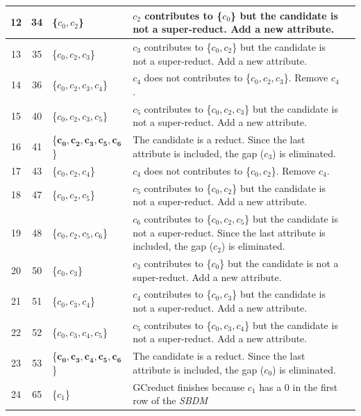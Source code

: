 \documentclass[number,preprint,review,12pt]{elsarticle}
\begin{document}
\begin{table}[!htb]
\begin{tabular}{|c|c|l|l|l|}
				\hline
		12 & 34 & \{$c_0,c_2$\}				& \multicolumn{1}{p{8.5cm}|}{$c_2$ contributes to \{$c_0$\} but the candidate is not a super-reduct. Add a new attribute.}\\
				\hline
		13 & 35 & \{$c_0,c_2,c_3$\}	    	& \multicolumn{1}{p{8.5cm}|}{$c_3$ contributes to \{$c_0,c_2$\} but the candidate is not a super-reduct. Add a new attribute.}\\
				\hline
		14 & 36 & \{$c_0,c_2,c_3,c_4$\}		& \multicolumn{1}{p{8.5cm}|}{$c_4$ does not contributes to \{$c_0,c_2,c_3$\}. Remove $c_4$.}\\
				\hline
		15 & 40 & \{$c_0,c_2,c_3,c_5$\}		& \multicolumn{1}{p{8.5cm}|}{$c_5$ contributes to \{$c_0,c_2,c_3$\} but the candidate is not a super-reduct. Add a new attribute.}\\
				\hline
		16 & 41 & \{$\mathbf{c_0,c_2,c_3,c_5,c_6}$\} & \multicolumn{1}{p{8.5cm}|}{The candidate is a reduct. Since the last attribute is included, the gap ($c_3$) is eliminated.}\\
				\hline
		17 & 43 & \{$c_0,c_2,c_4$\}			& \multicolumn{1}{p{8.5cm}|}{$c_4$ does not contributes to \{$c_0,c_2$\}. Remove $c_4$.}\\
				\hline
		18 & 47 & \{$c_0,c_2,c_5$\}			& \multicolumn{1}{p{8.5cm}|}{$c_5$ contributes to \{$c_0,c_2$\} but the candidate is not a super-reduct. Add a new attribute.}\\
				\hline
		19 & 48 & \{$c_0,c_2,c_5,c_6$\}		& \multicolumn{1}{p{8.5cm}|}{$c_6$ contributes to \{$c_0,c_2,c_5$\} but the candidate is not a super-reduct. Since the last attribute is included, the gap ($c_2$) is eliminated.}\\
				\hline
		20 & 50 & \{$c_0,c_3$\}				& \multicolumn{1}{p{8.5cm}|}{$c_3$ contributes to \{$c_0$\} but the candidate is not a super-reduct. Add a new attribute.}\\    
				\hline		
		21 & 51 & \{$c_0,c_3,c_4$\}			& \multicolumn{1}{p{8.5cm}|}{$c_4$ contributes to \{$c_0,c_3$\} but the candidate is not a super-reduct. Add a new attribute.}\\
				\hline
		22 & 52 & \{$c_0,c_3,c_4,c_5$\}		& \multicolumn{1}{p{8.5cm}|}{$c_5$ contributes to \{$c_0,c_3,c_4$\} but the candidate is not a super-reduct. Add a new attribute.}\\
				\hline
		23 & 53 & \{$\mathbf{c_0,c_3,c_4,c_5,c_6}$\} & \multicolumn{1}{p{8.5cm}|}{The candidate is a reduct. Since the last attribute is included, the gap ($c_0$) is eliminated.}\\
				\hline
		24 & 65 & \{$c_1$\} 				& \multicolumn{1}{p{8.5cm}|}{GCreduct finishes because $c_1$ has a 0 in the first row of the \textit{SBDM}} \\ %
		\hline
	\end{tabular}
\end{table}
	
\end{document}
